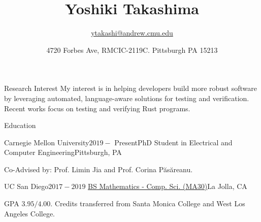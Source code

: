 \documentclass{resume} %
\title{\bf Yoshiki Takashima}
\author{\href{ytakashi@andrew.cmu.edu}{ytakashi@andrew.cmu.edu}}
\date{4720 Forbes Ave, RMCIC-2119C. Pittsburgh PA 15213}
\begin{document}
\maketitle

\begin{rSection}{Research Interest}
  My interest is in helping developers build more robust software by
  leveraging automated, language-aware solutions for testing and
  verification. Recent works focus on testing and verifying Rust
  programs.
\end{rSection}

\begin{rSection}{Education}
  \begin{rSubsection}{Carnegie Mellon University}{$2019 -$
      Present}{PhD Student in Electrical and Computer
      Engineering}{Pittsburgh, PA}
  \item Co-Advised by: Prof. Limin Jia and Prof. Corina P\u{a}s\u{a}reanu.
  \end{rSubsection}

  \begin{rSubsection}{UC San Diego}{$2017 -
      2019$}{
      \href{https://catalog.ucsd.edu/curric/MATH-ug.html}
      {BS Mathematics - Comp. Sci. (MA30)}}{La Jolla, CA}
  \item GPA $3.95/4.00$. Credits transferred from Santa Monica College
    and West Los Angeles College.
  \end{rSubsection}


\end{rSection}
\end{document}
